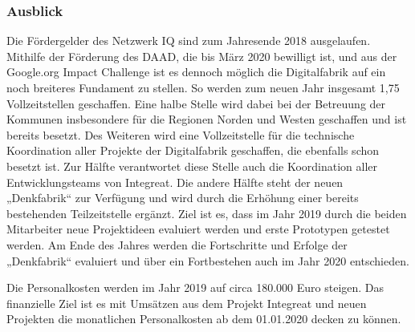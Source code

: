 \documentclass[12pt, a4paper]{article} %
\begin{document}
\hypertarget{ausblick}{%
\subsubsection{Ausblick}\label{ausblick}}

Die Fördergelder des Netzwerk IQ sind zum Jahresende 2018 ausgelaufen.
Mithilfe der Förderung des DAAD, die bis März 2020 bewilligt ist, und
aus der Google.org Impact Challenge ist es dennoch möglich die
Digitalfabrik auf ein noch breiteres Fundament zu stellen. So werden zum
neuen Jahr insgesamt 1,75 Vollzeitstellen geschaffen. Eine halbe Stelle
wird dabei bei der Betreuung der Kommunen insbesondere für die Regionen
Norden und Westen geschaffen und ist bereits besetzt. Des Weiteren wird
eine Vollzeitstelle für die technische Koordination aller Projekte der
Digitalfabrik geschaffen, die ebenfalls schon besetzt ist. Zur Hälfte
verantwortet diese Stelle auch die Koordination aller Entwicklungsteams
von Integreat. Die andere Hälfte steht der neuen „Denkfabrik“ zur
Verfügung und wird durch die Erhöhung einer bereits bestehenden
Teilzeitstelle ergänzt. Ziel ist es, dass im Jahr 2019 durch die beiden
Mitarbeiter neue Projektideen evaluiert werden und erste Prototypen
getestet werden. Am Ende des Jahres werden die Fortschritte und Erfolge
der „Denkfabrik“ evaluiert und über ein Fortbestehen auch im Jahr 2020
entschieden.

Die Personalkosten werden im Jahr 2019 auf circa 180.000 Euro steigen.
Das finanzielle Ziel ist es mit Umsätzen aus dem Projekt Integreat und
neuen Projekten die monatlichen Personalkosten ab dem 01.01.2020 decken
zu können.
\end{document}
